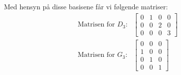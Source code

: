 \begin{losning}
\begin{punkt}
Med hensyn på disse basisene får vi følgende matriser:
\begin{align*}
\text{Matrisen for~$D_3$:} &
\begin{bmatrix}
0 & 1 & 0 & 0 \\
0 & 0 & 2 & 0 \\
0 & 0 & 0 & 3
\end{bmatrix}
\\
\text{Matrisen for~$G_3$:} &
\begin{bmatrix}
0 & 0 & 0 \\
1 & 0 & 0 \\
0 & 1 & 0 \\
0 & 0 & 1
\end{bmatrix}
\end{align*}



\end{punkt}
\end{losning}
